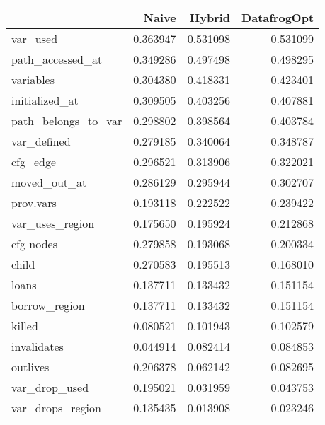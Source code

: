 \begin{tabular}{lrrr}
\toprule
{} &     Naive &    Hybrid &  DatafrogOpt \\
\midrule
var\_used            &  0.363947 &  0.531098 &     0.531099 \\
path\_accessed\_at    &  0.349286 &  0.497498 &     0.498295 \\
variables           &  0.304380 &  0.418331 &     0.423401 \\
initialized\_at      &  0.309505 &  0.403256 &     0.407881 \\
path\_belongs\_to\_var &  0.298802 &  0.398564 &     0.403784 \\
var\_defined         &  0.279185 &  0.340064 &     0.348787 \\
cfg\_edge            &  0.296521 &  0.313906 &     0.322021 \\
moved\_out\_at        &  0.286129 &  0.295944 &     0.302707 \\
prov.vars           &  0.193118 &  0.222522 &     0.239422 \\
var\_uses\_region     &  0.175650 &  0.195924 &     0.212868 \\
cfg nodes           &  0.279858 &  0.193068 &     0.200334 \\
child               &  0.270583 &  0.195513 &     0.168010 \\
loans               &  0.137711 &  0.133432 &     0.151154 \\
borrow\_region       &  0.137711 &  0.133432 &     0.151154 \\
killed              &  0.080521 &  0.101943 &     0.102579 \\
invalidates         &  0.044914 &  0.082414 &     0.084853 \\
outlives            &  0.206378 &  0.062142 &     0.082695 \\
var\_drop\_used       &  0.195021 &  0.031959 &     0.043753 \\
var\_drops\_region    &  0.135435 &  0.013908 &     0.023246 \\
\bottomrule
\end{tabular}
